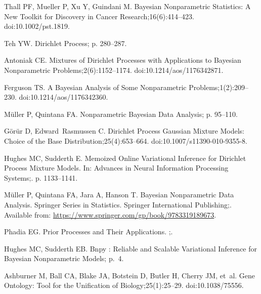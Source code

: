 \documentclass[10pt,letterpaper]{article}
\begin{document}
\begin{thebibliography}{10}
	Thall PF, Mueller P, Xu Y, Guindani M.
	\newblock Bayesian Nonparametric Statistics: {{A}} New Toolkit for Discovery in
	Cancer Research;16(6):414--423.
	\newblock doi:{10.1002/pst.1819}.
	
	Teh YW.
	\newblock Dirichlet Process; p. 280--287.
	
	Antoniak CE.
	\newblock Mixtures of {{Dirichlet Processes}} with {{Applications}} to
	{{Bayesian Nonparametric Problems}};2(6):1152--1174.
	\newblock doi:{10.1214/aos/1176342871}.
	
	Ferguson TS.
	\newblock A {{Bayesian Analysis}} of {{Some Nonparametric
			Problems}};1(2):209--230.
	\newblock doi:{10.1214/aos/1176342360}.
	
	Müller P, Quintana FA.
	\newblock Nonparametric Bayesian Data Analysis; p. 95--110.
	
	Görür D, Edward~Rasmussen C.
	\newblock Dirichlet {{Process Gaussian Mixture Models}}: {{Choice}} of the
	{{Base Distribution}};25(4):653--664.
	\newblock doi:{10.1007/s11390-010-9355-8}.
	
	Hughes MC, Sudderth E.
	\newblock Memoized Online Variational Inference for {{Dirichlet}} Process
	Mixture Models.
	\newblock In: Advances in Neural Information Processing Systems;. p.
	1133--1141.
	
	Müller P, Quintana FA, Jara A, Hanson T.
	\newblock Bayesian {{Nonparametric Data Analysis}}.
	\newblock Springer {{Series}} in {{Statistics}}. {Springer International
		Publishing};.
	\newblock Available from: \url{https://www.springer.com/gp/book/9783319189673}.
	
	Phadia EG.
	\newblock Prior Processes and Their Applications.
	;.
	
	Hughes MC, Sudderth EB.
	\newblock Bnpy : {{Reliable}} and Scalable Variational Inference for
	{{Bayesian}} Nonparametric Models; p.~4.
	
	Ashburner M, Ball CA, Blake JA, Botstein D, Butler H, Cherry JM, et~al.
	\newblock Gene {{Ontology}}: Tool for the Unification of Biology;25(1):25--29.
	\newblock doi:{10.1038/75556}.
	

\end{thebibliography}
\end{document}
